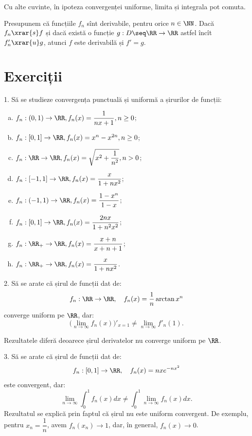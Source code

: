Cu alte cuvinte, în ipoteza convergenței uniforme, limita și integrala pot comuta.

\begin{theorem}\label{thm:transf-der}
    Presupunem că funcțiile $ f_n $ sînt derivabile, pentru orice $ n \in \NN $.
    Dacă $ f_n \xrar{s} f $ și dacă există o funcție $ g : D \seq \RR \to \RR $
    astfel încît $ f'_n \xrar{u} g $, atunci $ f $ este derivabilă și $ f' = g $.
\end{theorem}

\section{Exerciții}

1. Să se studieze convergența punctuală și uniformă a șirurilor de funcții:
\begin{enumerate}[(a)]
\item $ f_n : (0, 1) \to \RR, f_n(x) = \dfrac{1}{nx + 1}, n \geq 0 $;
\item $ f_n : [0, 1] \to \RR, f_n(x) = x^n - x^{2n}, n \geq 0 $;
\item $ f_n : \RR \to \RR, f_n(x) = \sqrt{x^2 + \dfrac{1}{n^2}}, n > 0 $;
\item $ f_n : [-1,1] \to \RR, f_n(x) = \dfrac{x}{1 + nx^2} $;
\item $ f_n : (-1, 1) \to \RR, f_n(x) = \dfrac{1 - x^n}{1 - x} $;
\item $ f_n : [0, 1] \to \RR, f_n(x) = \dfrac{2nx}{1 + n^2 x^2} $;
\item $ f_n : \RR_+ \to \RR, f_n(x) = \dfrac{x + n}{x + n + 1} $;
\item $ f_n : \RR_+ \to \RR, f_n(x) = \dfrac{x}{1 + nx^2} $.
\end{enumerate}

\vspace{1cm}

2. Să se arate că șirul de funcții dat de:
\[
  f_n : \RR \to \RR, \quad f_n(x) = \frac{1}{n} \arctan x^n
\]
converge uniform pe $ \RR $, dar:
\[
  \Big( \lim_{n \to \infty} f_n(x) \Big)'_{x = 1} \neq \lim_{n \to \infty} f'_n(1).
\]

Rezultatele diferă deoarece șirul derivatelor nu converge uniform pe $ \RR $.

\vspace{1cm}

3. Să se arate că șirul de funcții dat de:
\[
  f_n : [0, 1] \to \RR, \quad f_n(x) = nxe^{-nx^2}
\]
este convergent, dar:
\[
  \lim_{n \to \infty} \int_0^1 f_n(x) dx \neq \int_0^1 \lim_{n \to \infty} f_n(x) dx.
\]
Rezultatul se explică prin faptul că șirul nu este uniform convergent.
De exemplu, pentru $ x_n = \dfrac{1}{n} $, avem $ f_n(x_n) \to 1 $, dar,
în general, $ f_n(x) \to 0 $.

\vspace{1cm}

